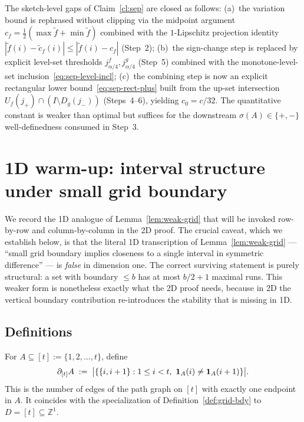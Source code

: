 \begin{remark}\label{rem:cl-sep-proof}
The sketch-level gaps of Claim~\ref{cl:sep} are closed as follows:
(a)~the variation bound is rephrased without clipping via the midpoint
argument $c_f=\tfrac12(\max\tilde f+\min\tilde f)$ combined with the
$1$-Lipschitz projection identity $|\tilde f(i)-\tilde c_f(i)|\le|\tilde f(i)-c_f|$
(Step~2); (b)~the sign-change step is replaced by explicit level-set
thresholds $j^f_{\alpha/4},j^g_{\alpha/4}$ (Step~5) combined with the
monotone-level-set inclusion~\eqref{eq:sep-level-incl}; (c)~the combining
step is now an explicit rectangular lower bound~\eqref{eq:sep-rect-plus}
built from the up-set intersection $U_f(j_+)\cap(I\setminus D_g(j_-))$
(Steps~4--6), yielding $c_0=c/32$. The quantitative constant is weaker
than optimal but suffices for the downstream $\sigma(A)\in\{+,-\}$
well-definedness consumed in Step~3.
\end{remark}

\section{1D warm-up: interval structure under small grid boundary}
\label{sec:1d-warmup}

We record the 1D analogue of Lemma~\ref{lem:weak-grid} that will be
invoked row-by-row and column-by-column in the 2D proof. The crucial
caveat, which we establish below, is that the literal 1D transcription
of Lemma~\ref{lem:weak-grid} --- ``small grid boundary implies
closeness to a single interval in symmetric difference'' --- is
\emph{false} in dimension one. The correct surviving statement is
purely structural: a set with boundary $\le b$ has at most $b/2 + 1$
maximal runs. This weaker form is nonetheless exactly what the 2D
proof needs, because in 2D the vertical boundary contribution
re-introduces the stability that is missing in 1D.

\subsection{Definitions}

\begin{definition}\label{def:1d-bdy}
For $A \subseteq [t] := \{1, 2, \dots, t\}$, define
\[
\partial_{[t]} A \;:=\; \bigl|\{ \{i, i+1\} : 1 \le i < t,\ \mathbf{1}_A(i) \ne \mathbf{1}_A(i+1) \}\bigr|.
\]
This is the number of edges of the path graph on $[t]$ with exactly
one endpoint in $A$. It coincides with the specialization of
Definition~\ref{def:grid-bdy} to $D = [t] \subseteq \mathbb{Z}^1$.
\end{definition}

